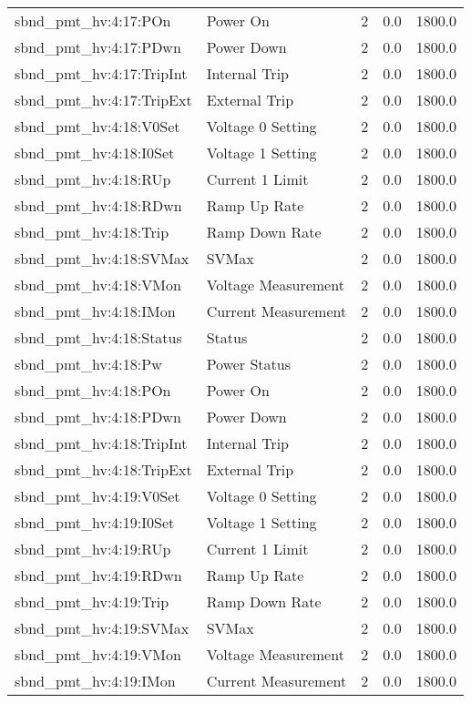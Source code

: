 \begin{center}
\begin{longtable}{l | l l l l }
sbnd\_pmt\_hv:4:17:POn & Power On & 2 & 0.0 & 1800.0\\ 
sbnd\_pmt\_hv:4:17:PDwn & Power Down & 2 & 0.0 & 1800.0\\ 
sbnd\_pmt\_hv:4:17:TripInt & Internal Trip & 2 & 0.0 & 1800.0\\ 
sbnd\_pmt\_hv:4:17:TripExt & External Trip & 2 & 0.0 & 1800.0\\ 
sbnd\_pmt\_hv:4:18:V0Set & Voltage 0 Setting & 2 & 0.0 & 1800.0\\ 
sbnd\_pmt\_hv:4:18:I0Set & Voltage 1 Setting & 2 & 0.0 & 1800.0\\ 
sbnd\_pmt\_hv:4:18:RUp & Current 1 Limit & 2 & 0.0 & 1800.0\\ 
sbnd\_pmt\_hv:4:18:RDwn & Ramp Up Rate & 2 & 0.0 & 1800.0\\ 
sbnd\_pmt\_hv:4:18:Trip & Ramp Down Rate & 2 & 0.0 & 1800.0\\ 
sbnd\_pmt\_hv:4:18:SVMax & SVMax & 2 & 0.0 & 1800.0\\ 
sbnd\_pmt\_hv:4:18:VMon & Voltage Measurement & 2 & 0.0 & 1800.0\\ 
sbnd\_pmt\_hv:4:18:IMon & Current Measurement & 2 & 0.0 & 1800.0\\ 
sbnd\_pmt\_hv:4:18:Status & Status & 2 & 0.0 & 1800.0\\ 
sbnd\_pmt\_hv:4:18:Pw & Power Status & 2 & 0.0 & 1800.0\\ 
sbnd\_pmt\_hv:4:18:POn & Power On & 2 & 0.0 & 1800.0\\ 
sbnd\_pmt\_hv:4:18:PDwn & Power Down & 2 & 0.0 & 1800.0\\ 
sbnd\_pmt\_hv:4:18:TripInt & Internal Trip & 2 & 0.0 & 1800.0\\ 
sbnd\_pmt\_hv:4:18:TripExt & External Trip & 2 & 0.0 & 1800.0\\ 
sbnd\_pmt\_hv:4:19:V0Set & Voltage 0 Setting & 2 & 0.0 & 1800.0\\ 
sbnd\_pmt\_hv:4:19:I0Set & Voltage 1 Setting & 2 & 0.0 & 1800.0\\ 
sbnd\_pmt\_hv:4:19:RUp & Current 1 Limit & 2 & 0.0 & 1800.0\\ 
sbnd\_pmt\_hv:4:19:RDwn & Ramp Up Rate & 2 & 0.0 & 1800.0\\ 
sbnd\_pmt\_hv:4:19:Trip & Ramp Down Rate & 2 & 0.0 & 1800.0\\ 
sbnd\_pmt\_hv:4:19:SVMax & SVMax & 2 & 0.0 & 1800.0\\ 
sbnd\_pmt\_hv:4:19:VMon & Voltage Measurement & 2 & 0.0 & 1800.0\\ 
sbnd\_pmt\_hv:4:19:IMon & Current Measurement & 2 & 0.0 & 1800.0\\ 

\end{longtable}
\end{center}
